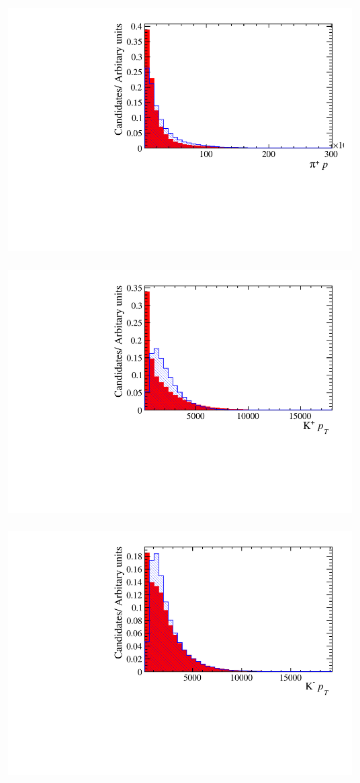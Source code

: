 \begin{figure}[!h]
\begin{subfigure}[t]{0.22\textwidth}
      \includegraphics[width=1.0\textwidth]{figs/Selection/Ds_BDT_Var_Ds2KKPi_D_P_P.pdf}
   \end{subfigure}
   \begin{subfigure}[t]{0.22\textwidth}
      \centering
      \includegraphics[width=1.0\textwidth]{figs/Selection/Ds_BDT_Var_Ds2KKPi_D_K0_PT.pdf}
   \end{subfigure}
   \begin{subfigure}[t]{0.22\textwidth}
      \centering
      \includegraphics[width=1.0\textwidth]{figs/Selection/Ds_BDT_Var_Ds2KKPi_D_K1_PT.pdf}

\end{subfigure}
\end{figure}
